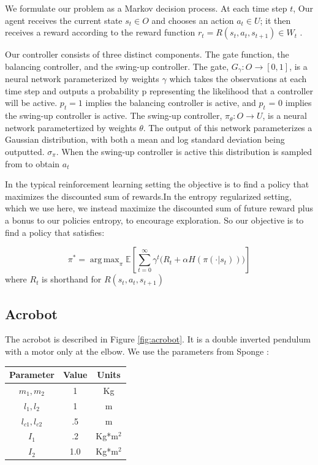 \documentclass[letterpaper, 10 pt, conference]{ieeeconf}
\DeclareMathOperator*{\argmax}{arg\,max}
\begin{document}
We formulate our problem as a Markov decision process. At each time step $t$, Our agent receives the current state $s_{t} \in O$ and chooses an action $a_{t} \in U$; it then receives a reward according to the reward function $r_{t} = R(s_{t}, a_{t}, s_{t+1})\in W_{t}$ . 

Our controller consists of three distinct components. The gate function, the balancing controller, and the swing-up controller. The gate, $G_{\gamma}: O \rightarrow [0,1]$, is a neural network parameterized by weights $\gamma$ which takes the observations at each time step and outputs a probability p representing the likelihood that a controller will be active. $p_{t} = 1$ implies the balancing controller is active, and $p_{t}$ = 0 implies the swing-up controller is active.  The swing-up controller, $\pi_{\theta} : O \rightarrow U $, is a neural network parametertized by weights $\theta$. The output of this network parameterizes a Gaussian distribution, with both a mean and log standard deviation being outputted. $\sigma_{\pi}$. When the swing-up controller is active this distribution is sampled from to obtain $a_{t}$

In the typical reinforcement learning setting the objective is to find a policy that maximizes the discounted sum of rewards.In the entropy regularized setting, which we use here, we instead maximize the discounted sum of future reward plus a bonus to our policies entropy, to encourage exploration. So our objective is to find a policy that satisfies:
 
 \begin{dmath} \pi^{*} = \argmax_{\pi} \mathbb{E}\left[ \sum_{t=0}^{\infty}\gamma^{t}\bigg(R_{t} + \alpha H(\pi(\cdot|s_{t}))\bigg) \right]  \end{dmath}
 where $R_{t}$ is shorthand for $R(s_{t}, a_{t}, s_{t+1})$

\subsection{Acrobot}
\label{section:Acrobot}

The acrobot is described in Figure \ref{fig:acrobot}. It is a double inverted pendulum with a motor only at the elbow. We use the parameters from Sponge \cite{spong_swing_1994}:

\begin{center}
\begin{tabular}{ | c | c | c | }
\hline
Parameter & Value & Units\\
 \hline
 $m_{1}, m_{2}$ & 1 & Kg \\ 
 \hline
 $l_{1}, l_{2}$ & 1 & m  \\ 
 \hline
 $l_{c1}, l_{c2}$  & .5 & m  \\ 
 \hline
 $I_{1}$ & .2 & Kg*m$^{2}$ \\
 \hline 
 $I_{2}$ & 1.0 & Kg*m$^{2}$  \\ 
 \hline
\end{tabular}
\end{center}
\end{document}
